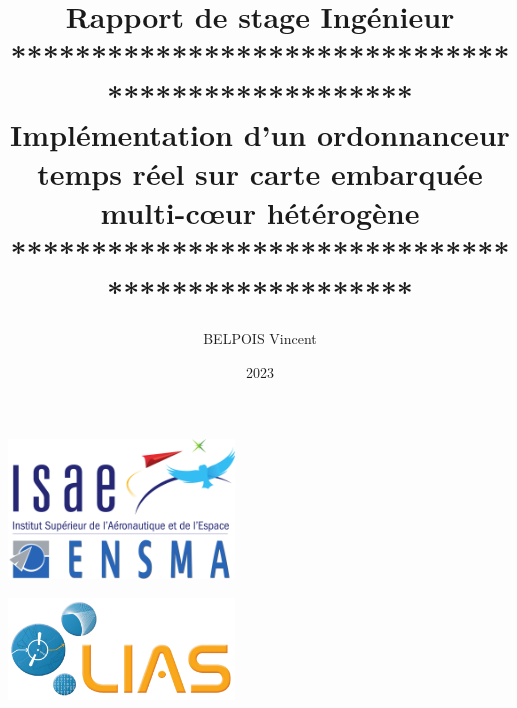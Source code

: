 \documentclass[11pt]{article}
\title{Rapport de stage Ingénieur\vspace{10pt}\\**************************************************\\Implémentation d'un ordonnanceur temps réel sur
carte embarquée multi-cœur hétérogène\vspace{10pt} \\**************************************************}
\author{BELPOIS Vincent}
\begin{document}
\date{2023}
\maketitle
\thispagestyle{empty}

\vspace{10mm}

    \begin{center}
    \includegraphics[width = 6cm]{Images/logo_ensma.png}
    \end{center}
    \vspace{2cm}
    \begin{center}
        \includegraphics[width = 6cm]{Images/logo_LIAS.png}
    \end{center}
    \newpage
    \thispagestyle{empty}
    \mbox{}
    
    

    
\end{document}
